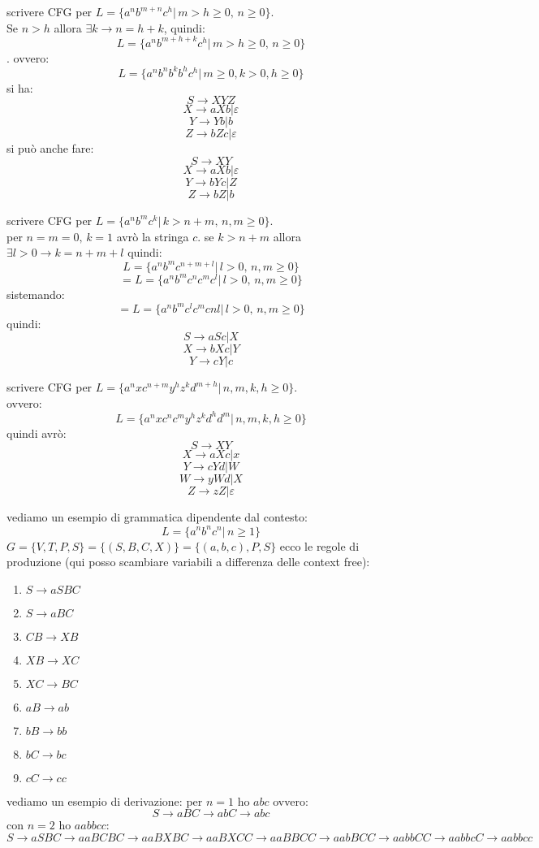 \documentclass[a4paper,12pt, oneside]{book}
\begin{document}
\begin{esempio}
scrivere CFG per $L=\{a^nb^{m+n}c^h|\, m>h\geq0,\, n\geq0\}
$.\\
Se $n>h$ allora $\exists k \to n= h+k$, quindi:
$$L=\{a^nb^{m+h+k}c^h|\, m>h\geq0,\, n\geq0\}$$. ovvero:
$$L=\{a^nb^nb^kb^hc^h|\, m\geq 0, k>0, h\geq 0\}$$
si ha:
$$S\to XYZ$$
$$X\to aXb|\varepsilon$$
$$Y\to Yb|b$$
$$Z\to bZc|\varepsilon$$
si può anche fare:
$$S\to XY$$
$$X\to aXb|\varepsilon$$
$$Y\to bYc|Z$$
$$Z\to bZ|b$$
\end{esempio}
\begin{esempio}
scrivere CFG per $L=\{a^nb^mc^k|\, k>n+m,\, n,m\geq 0\}
$.\\
per $n=m=0,\, k=1$ avrò la stringa $c$.
se $k>n+m$ allora $\exists l>0\to k=n+m+l$ quindi:
$$L=\{a^nb^mc^{n+m+l}|\, l>0,\, n,m\geq 0\}
$$
$$=L=\{a^nb^mc^nc^mc^l|\, l>0,\, n,m\geq 0\}$$
sistemando:
$$=L=\{a^nb^mc^lc^mcnl|\, l>0,\, n,m\geq 0\}$$
quindi:
$$S\to aSc|X$$
$$X\to bXc|Y$$
$$Y\to cY|c$$
\end{esempio}
\newpage
\begin{esempio}
scrivere CFG per $L=\{a^nxc^{n+m}y^hz^kd^{m+h}|\, n,m,k,h\geq 0\}
$.\\
ovvero:
$$L=\{a^nxc^nc^my^hz^kd^hd^m|\, n,m,k,h\geq 0\}$$
quindi avrò:
$$S\to XY$$
$$X\to aXc|x$$
$$Y\to cYd|W$$
$$W\to yWd|X$$
$$Z\to zZ|\varepsilon$$
\end{esempio}
\begin{esempio}
vediamo un esempio di grammatica dipendente dal contesto:
$$L=\{a^nb^nc^n|\, n\geq 1\}$$
$G=\{V,T,P,S\}=\{(S,B,C,X)\}=\{(a,b,c),P,S\}$
ecco le regole di produzione (qui posso scambiare variabili a differenza delle context free):
\begin{enumerate}
\item $S\to aSBC$
\item $S\to aBC$
\item $CB\to XB$
\item $XB\to XC$
\item $XC\to BC$
\item $aB\to ab$
\item $bB\to bb$
\item $bC\to bc$
\item $cC\to cc$
\end{enumerate}
vediamo un esempio di derivazione:
per $n=1$ ho $abc$ ovvero:
$$S\to aBC\to abC\to abc$$
con $n=2$ ho $aabbcc$:
$S\to aSBC\to aaBCBC\to aaBXBC\to aaBXCC\to aaBBCC\to aabBCC\to aabbCC\to aabbcC\to aabbcc$
\end{esempio}
\end{document}
